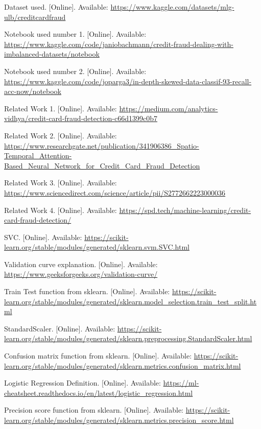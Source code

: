 \documentclass[conference]{IEEEtran}
\begin{document}
\begin{thebibliography}{99}

 Dataset used. [Online]. Available: \url{https://www.kaggle.com/datasets/mlg-ulb/creditcardfraud}

 Notebook used number 1. [Online]. Available: \url{https://www.kaggle.com/code/janiobachmann/credit-fraud-dealing-with-imbalanced-datasets/notebook}

 Notebook used number 2. [Online]. Available: \url{https://www.kaggle.com/code/joparga3/in-depth-skewed-data-classif-93-recall-acc-now/notebook}

 Related Work 1. [Online]. Available: \url{https://medium.com/analytics-vidhya/credit-card-fraud-detection-c66d1399c0b7}

 Related Work 2. [Online]. Available: \url{https://www.researchgate.net/publication/341906386_Spatio-Temporal_Attention-Based_Neural_Network_for_Credit_Card_Fraud_Detection}

 Related Work 3. [Online]. Available: \url{https://www.sciencedirect.com/science/article/pii/S2772662223000036}

 Related Work 4. [Online]. Available: \url{https://spd.tech/machine-learning/credit-card-fraud-detection/}

 SVC. [Online]. Available: \url{https://scikit-learn.org/stable/modules/generated/sklearn.svm.SVC.html}

 Validation curve explanation. [Online]. Available: \url{https://www.geeksforgeeks.org/validation-curve/}

 Train Test function from sklearn. [Online]. Available: \url{https://scikit-learn.org/stable/modules/generated/sklearn.model_selection.train_test_split.html}

 StandardScaler. [Online]. Available: \url{https://scikit-learn.org/stable/modules/generated/sklearn.preprocessing.StandardScaler.html}

 Confusion matrix function from sklearn. [Online]. Available: \url{https://scikit-learn.org/stable/modules/generated/sklearn.metrics.confusion_matrix.html}

 Logistic Regression Definition. [Online]. Available: \url{https://ml-cheatsheet.readthedocs.io/en/latest/logistic_regression.html}

 Precision score function from sklearn. [Online]. Available: \url{https://scikit-learn.org/stable/modules/generated/sklearn.metrics.precision_score.html}


\end{thebibliography}
\end{document}
